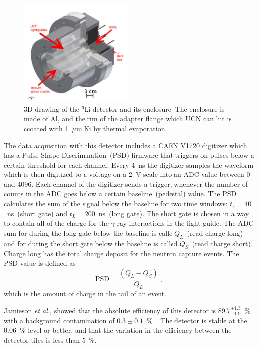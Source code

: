 \begin{figure}[h!]
  \centering
  \includegraphics[width=0.5\textwidth]{Li6detector.png}
  \caption{3D drawing of the $^6$Li detector and its enclosure. The
    enclosure is made of Al, and the rim of the adapter flange which
    UCN can hit is ccoated with 1~$\mu$m Ni by thermal evaporation. }
  \label{fig:Li6detector}
\end{figure}

The data acquisition with this detector includes a CAEN V1720
digitizer which has a Pulse-Shape Discrimination~(PSD) firmware that
triggers on pulses below a certain threshold for each channel. Every
4~ns the digitizer samples the waveform which is then digitized to a
voltage on a 2~V scale into an ADC value between 0 and 4096. Each
channel of the digitizer sends a trigger, whenever the number of
counts in the ADC goes below a certain baseline~(pedestal) value. The
PSD calculates the sum of the signal below the baseline for two time
windows: $t_s = 40$~ns~(short gate) and $t_L = 200$~ns~(long
gate). The short gate is chosen in a way to contain all of the charge
for the $\gamma$-ray interactions in the light-guide. The ADC sum for
during the long gate below the baseline is calle $Q_L$~(read charge
long) and for during the short gate below the baseline is called
$Q_S$~(read charge short). Charge long has the total charge deposit
for the neutron capture events. The PSD value is defined as
\begin{equation}
  \label{eq:psd}
  \mathrm{PSD} = \frac{\left( Q_L - Q_S\right)}{Q_L}~,
\end{equation}  
which is the amount of charge in the tail of an event.

Jamieson {\it{et al.}}, showed that the absolute efficiency of this
detector is $89.7^{+1.3}_{-1.9}$~\% with a background contamination of
$0.3 \pm 0.1$~\%~\cite{jamieson2017characterization}. The detector is
stable at the 0.06~\% level or better, and that the variation in the
efficiency between the detector tiles is less than 5~\%.
